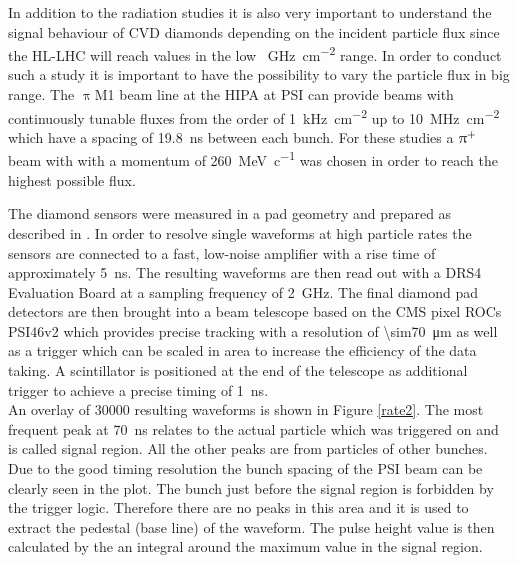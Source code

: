In addition to the radiation studies it is also very important to understand the signal behaviour of \ac{CVD} diamonds depending on the incident particle flux since the \ac{HL-LHC} will reach values in the low \SI{}{\giga\hertz\per\centi\meter^2} range. In order to conduct such a study it is important to have the possibility to vary the particle flux in big range. The $\uppi$M1 beam line at the \ac{HIPA} at \ac{PSI} can provide beams with continuously tunable fluxes from the order of \SI{1}{\kilo\hertz\per\centi\meter^2} up to \SI{10}{\mega\hertz\per\centi\meter^2} which have a spacing of \SI{19.8}{\nano\second} between each bunch. For these studies a $\uppi^{\text{+}}$ beam with with a momentum of \SI{260}{\mega\electronvolt\per c} was chosen in order to reach the highest possible flux.\par
The diamond sensors were measured in a pad geometry and prepared as described in \cite{rainer}. 
In order to resolve single waveforms at high particle rates the sensors are connected to a fast, low-noise amplifier with a rise time of approximately \SI{5}{\nano\second}. The resulting waveforms are then read out with a DRS4 Evaluation Board at a sampling frequency of \SI{2}{\giga\hertz}. The final diamond pad detectors are then brought into a beam telescope based on the CMS pixel \acp{ROC} PSI46v2 \cite{kornmayer} which provides precise tracking with a resolution of \SI{\sim70}{\micro\meter} as well as a trigger which can be scaled in area to increase the efficiency of the data taking. A scintillator is positioned at the end of the telescope as additional trigger to achieve a precise timing of \SI{1}{\nano\second}.\\
An overlay of 30000 resulting waveforms is shown in Figure \vref{rate2}. The most frequent peak at \SI{70}{\nano\second} relates to the actual particle which was triggered on and is called signal region. All the other peaks are from particles of other bunches. Due to the good timing resolution the bunch spacing of the \ac{PSI} beam can be clearly seen in the plot. The bunch just before the signal region is forbidden by the trigger logic. Therefore there are no peaks in this area and it is used to extract the pedestal (base line) of the waveform. The pulse height value is then calculated by the an integral around the maximum value in the signal region.\\

